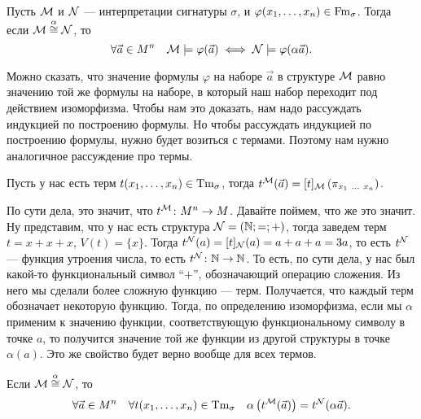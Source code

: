 \begin{theorem}
    Пусть $\mathcal{M}$ и $\mathcal{N}$ --- интерпретации сигнатуры $\sigma$, и $\varphi(x_{1}, \ldots, x_{n}) \in \mathrm{Fm}_{\sigma}$.
    Тогда если $\mathcal{M} \overset{\alpha}{\cong} \mathcal{N}$, то 
    $$
        \forall \vec{a} \in M^{n} \quad \mathcal{M} \models \varphi(\vec{a}) \iff \mathcal{N} \models \varphi(\alpha \vec{a}).
    $$
\end{theorem}

Можно сказать, что значение формулы $\varphi$ на наборе $\vec{a}$ в структуре $\mathcal{M}$ равно значению той же формулы на наборе, в который наш набор переходит под действием изоморфизма.
Чтобы нам это доказать, нам надо рассуждать индукцией по построению формулы.
Но чтобы рассуждать индукцией по построению формулы, нужно будет возиться с термами.
Поэтому нам нужно аналогичное рассуждение про термы.

\begin{definition}
    Пусть у нас есть терм $t(x_{1}, \ldots, x_{n}) \in \mathrm{Tm}_{\sigma}$,
    тогда $t^{\mathcal{M}}(\vec{a}) = [t]_{\mathcal{M}}\left( \pi_{x_{1}~\ldots~x_{n}} \right)$.
\end{definition}

По сути дела, это значит, что $t^{\mathcal{M}} \colon M^{n} \to M$.
Давайте поймем, что же это значит.
Ну представим, что у нас есть структура $\mathcal{N} = (\mathbb{N}; =; +)$, тогда заведем терм $t = x + x + x$, $V(t) = \{x\}$.
Тогда $t^{\mathcal{N}}(a) = [t]_{\mathcal{N}}(a) = a + a + a = 3a$, то есть $t^{\mathcal{N}}$ --- функция утроения числа, то есть $t^{\mathcal{N}} \colon \mathbb{N} \to \mathbb{N}$.
То есть, по сути дела, у нас был какой-то функциональный символ \enquote{$+$}, обозначающий операцию сложения.
Из него мы сделали более сложную функцию --- терм.
Получается, что каждый терм обозначает некоторую функцию.
Тогда, по определению изоморфизма, если мы $\alpha$ применим к значению функции, соответствующую функциональному символу в точке $a$, то получится значение той же функции из другой структуры в точке $\alpha(a)$.
Это же свойство будет верно вообще для всех термов.

\begin{lemma} \label{lem::term-isomorphism}
    Если $\mathcal{M} \overset{\alpha}{\cong} \mathcal{N}$, то 
    $$
    \forall \vec{a} \in M^{n} \quad \forall t(x_{1}, \ldots, x_{n}) \in \mathrm{Tm}_{\sigma} \quad \alpha\left(t^{\mathcal{M}}(\vec{a})\right) = t^{\mathcal{N}}(\alpha\vec{a}).
    $$
\end{lemma}

